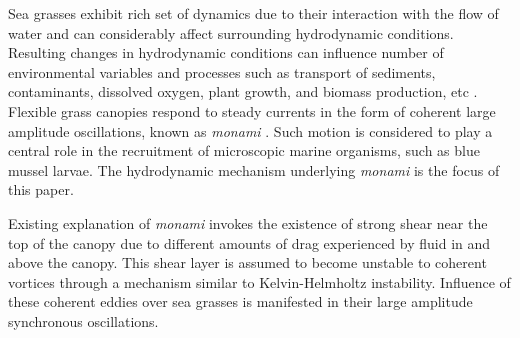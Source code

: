 \documentclass[aps,prl,reprint,twocolumn,showpacs,superscriptaddress,10pt]{revtex4-1}  %
\newcommand{\monami}{\textit{monami }}
\begin{document}
\maketitle
Sea grasses exhibit rich set of dynamics due to their interaction with the flow of water and can considerably affect surrounding hydrodynamic conditions.
Resulting changes in hydrodynamic conditions can influence number of environmental variables and processes such as transport of sediments, contaminants, dissolved oxygen, plant growth, and biomass production, etc \cite{Fonseca87,Nepf99,Nepf2012}. 
Flexible grass canopies respond to steady currents in the form of coherent large amplitude oscillations, known as \monami \cite{AckermanOkubo93}. Such motion is considered to play a central role in the recruitment 
of microscopic marine organisms, such as blue mussel larvae\cite{Grizzle96}.
The hydrodynamic mechanism underlying \monami is the focus of this paper. 

Existing explanation of \monami invokes the existence of strong shear near the top of the canopy \cite{Ghisal02,Raupach96} due to different amounts of drag experienced by fluid in and above the canopy. 
This shear layer is assumed to become unstable to coherent vortices through a mechanism similar to Kelvin-Helmholtz instability. 
Influence of these coherent eddies over sea grasses is manifested in their large amplitude synchronous oscillations.
\end{document}
